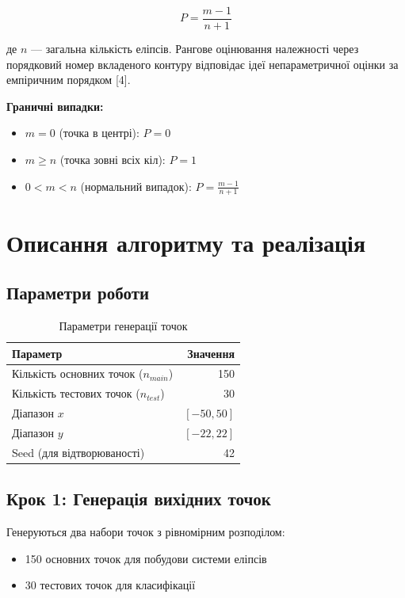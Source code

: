 \documentclass[12pt,a4paper]{article}
\begin{document}
\begin{equation}
P = \frac{m - 1}{n + 1}
\end{equation}

де $n$ — загальна кількість еліпсів. Рангове оцінювання належності через порядковий номер вкладеного контуру відповідає ідеї непараметричної оцінки за емпіричним порядком [4].

\textbf{Граничні випадки:}
\begin{itemize}
    \item $m = 0$ (точка в центрі): $P = 0$
    \item $m \geq n$ (точка зовні всіх кіл): $P = 1$
    \item $0 < m < n$ (нормальний випадок): $P = \frac{m-1}{n+1}$
\end{itemize}

\section{Описання алгоритму та реалізація}

\subsection{Параметри роботи}

\begin{table}[H]
\centering
\begin{tabular}{|l|r|}
\toprule
\textbf{Параметр} & \textbf{Значення} \\
\midrule
Кількість основних точок ($n_{main}$) & 150 \\
Кількість тестових точок ($n_{test}$) & 30 \\
Діапазон $x$ & $[-50, 50]$ \\
Діапазон $y$ & $[-22, 22]$ \\
Seed (для відтворюваності) & 42 \\
\bottomrule
\end{tabular}
\caption{Параметри генерації точок}
\end{table}

\subsection{Крок 1: Генерація вихідних точок}

Генеруються два набори точок з рівномірним розподілом:
\begin{itemize}
    \item 150 основних точок для побудови системи еліпсів
    \item 30 тестових точок для класифікації
\end{itemize}
\end{document}
